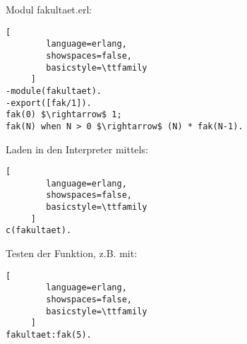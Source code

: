 \documentclass[10pt]{article}
\begin{document}
Modul fakultaet.erl:
\begin{lstlisting}[
        language=erlang,
        showspaces=false,
        basicstyle=\ttfamily
     ]
-module(fakultaet).
-export([fak/1]).
fak(0) $\rightarrow$ 1;
fak(N) when N > 0 $\rightarrow$ (N) * fak(N-1).
\end{lstlisting}
Laden in den Interpreter mittels:
\begin{lstlisting}[
        language=erlang,
        showspaces=false,
        basicstyle=\ttfamily
     ] 
c(fakultaet).
\end{lstlisting}
Testen der Funktion, z.B. mit:
\begin{lstlisting}[
        language=erlang,
        showspaces=false,
        basicstyle=\ttfamily
     ]
fakultaet:fak(5).
\end{lstlisting}
\end{document}
